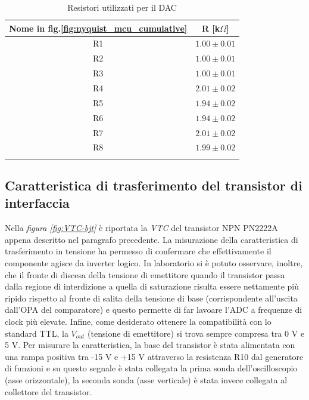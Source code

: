 \documentclass[journal]{IEEEtran}
\begin{document}
\begin{table}[H]
\begin{center}
\caption{Resistori utilizzati per il DAC}
\begin{tabular}{|c|c|}
\hline
Nome in fig.\ref{fig:nyquist_mcu_cumulative} & R [k$\Omega $] \\ \hline
R1  & $1.00 \pm 0.01$ \\
R2  & $1.00 \pm 0.01$ \\
R3  & $1.00 \pm 0.01$ \\
R4  & $2.01 \pm 0.02$ \\
R5  & $1.94 \pm 0.02$ \\
R6  & $1.94 \pm 0.02$ \\
R7  & $2.01 \pm 0.02$ \\
R8  & $1.99 \pm 0.02$ \\ \hline
\label{tab:resistori_dac}
\end{tabular}
\end{center}
\end{table}


\subsection{Caratteristica di trasferimento del transistor di interfaccia}
Nella \textit{figura \ref{fig:VTC-bjt}} è riportata la \textit{VTC} del transistor NPN PN2222A appena descritto nel paragrafo precedente. La misurazione della caratteristica di trasferimento in tensione ha permesso di confermare che effettivamente il componente agisce da inverter logico. In laboratorio si è potuto osservare, inoltre, che il fronte di discesa della tensione di emettitore quando il transistor passa dalla regione di interdizione a quella di saturazione risulta essere nettamente più ripido rispetto al fronte di salita della tensione di base (corrispondente all'uscita dall'OPA del comparatore) e questo permette di far lavoare l'ADC a frequenze di clock più elevate. Infine, come desiderato ottenere la compatibilità con lo standard TTL, la $V_{out}$ (tensione di emettitore) si trova sempre compresa tra 0 V e 5 V. Per misurare la caratteristica, la base del transistor è stata alimentata con una rampa positiva tra -15 V e +15 V attraverso la resistenza R10 dal generatore di funzioni e su questo segnale è stata collegata la prima sonda dell'oscilloscopio (asse orizzontale), la seconda sonda (asse verticale) è stata invece collegata al collettore del transistor.
\end{document}

